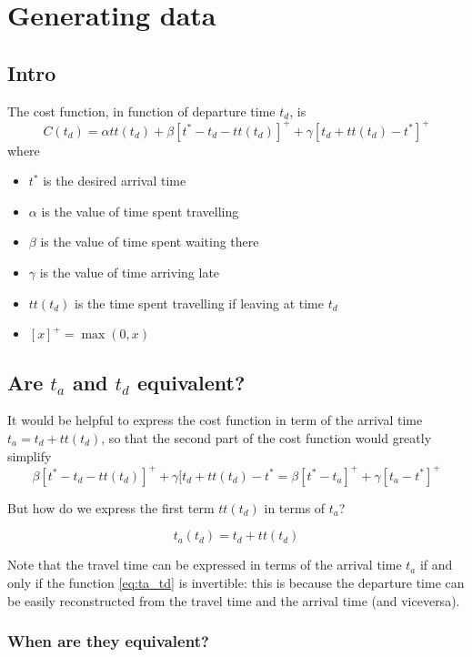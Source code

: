 \documentclass{article}
\begin{document}
\section{Generating data}

\subsection{Intro}

The cost function, in function of departure time \(t_d\), is
\begin{equation}
  \label{eq:cost_td}
  C(t_d) = \alpha tt(t_d) + \beta[t^*-t_d-tt(t_d)]^+ + \gamma[t_d+tt(t_d)-t^*]^+ 
\end{equation}
where
\begin{itemize}
\item \(t^*\) is the desired arrival time
\item \(\alpha\) is the value of time spent travelling
\item \(\beta\) is the value of time spent waiting there
\item \(\gamma\) is the value of time arriving late
\item \(tt(t_d)\) is the time spent travelling if leaving at time \(t_d\)
\item \([x]^+ = \max(0, x)\)
\end{itemize}

\subsection{Are $t_a$ and $t_d$ equivalent?}

It would be helpful to express the cost function in term of the arrival time \(t_a = t_d + tt(t_d)\),
so that the second part of the cost function would greatly simplify
\[ \beta[t^*-t_d-tt(t_d)]^+ + \gamma[t_d+tt(t_d)-t^* = \beta[t^*-t_a]^+ + \gamma[t_a-t^*]^+ \]

But how do we express the first term \(tt(t_d)\) in terms of \(t_a\)?

\begin{equation}
  \label{eq:ta_td}
  t_a(t_d) = t_d + tt(t_d)
\end{equation}

Note that the travel time can be expressed in terms of the arrival time \(t_a\) if and only if the function
\eqref{eq:ta_td} is invertible:
this is because the departure time can be easily reconstructed from the travel time and the arrival time (and viceversa).

\subsubsection{When are they equivalent?}
\end{document}
